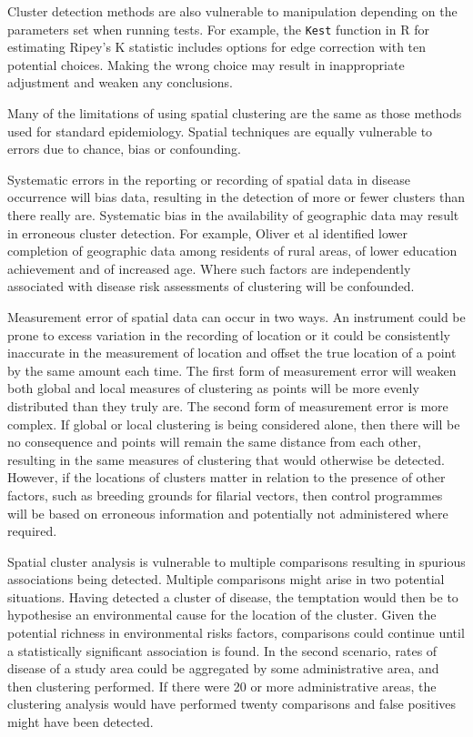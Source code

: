 \documentclass[11pt,a4paper,twoside]{article}\usepackage[]{graphicx}\usepackage[]{color}
\begin{document}
Cluster detection methods are also vulnerable to manipulation depending on the parameters set when running tests.
For example, the \texttt{Kest} function in R for estimating Ripey's K statistic includes options for edge correction with ten potential choices. 
Making the wrong choice may result in inappropriate adjustment and weaken any conclusions. 

Many of the limitations of using spatial clustering are the same as those methods used for standard epidemiology. 
Spatial techniques are equally vulnerable to errors due to chance, bias or confounding. 

Systematic errors in the reporting or recording of spatial data in disease occurrence will bias data, resulting in the detection of more or fewer clusters than there really are. 
Systematic bias in the availability of geographic data may result in erroneous cluster detection. 
For example, Oliver et al identified lower completion of geographic data among residents of rural areas, of lower education achievement and of increased age. \cite{Oliver2005}
Where such factors are independently associated with disease risk assessments of clustering will be confounded. 

Measurement error of spatial data can occur in two ways. 
An instrument could be prone to excess variation in the recording of location or it could be consistently inaccurate in the measurement of location and offset the true location of a point by the same amount each time. 
The first form of measurement error will weaken both global and local measures of clustering as points will be more evenly distributed than they truly are. 
The second form of measurement error is more complex. 
If global or local clustering is being considered alone, then there will be no consequence and points will remain the same distance from each other, resulting in the same measures of clustering that would otherwise be detected.
However, if the locations of clusters matter in relation to the presence of other factors, such as breeding grounds for filarial vectors, then control programmes will be based on erroneous information and potentially not administered where required. 

Spatial cluster analysis is vulnerable to  multiple comparisons resulting in spurious associations being detected. \cite{Olsen1996}
Multiple comparisons might arise in two potential situations. 
Having detected a cluster of disease, the temptation would then be to hypothesise an environmental cause for the location of the cluster. 
Given the potential richness in environmental risks factors, comparisons could continue until a statistically significant association is found. 
In the second scenario, rates of disease of a study area could be aggregated by some administrative area, and then clustering performed. 
If there were 20 or more administrative areas, the clustering analysis would have performed twenty comparisons and false positives might have been detected. 
\end{document}

